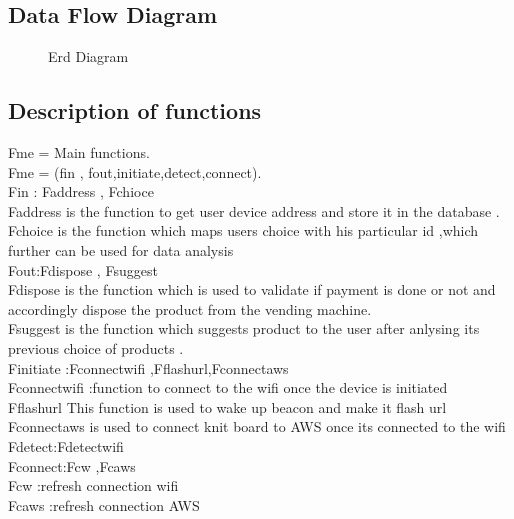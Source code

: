 \documentclass[oneside,a4paper,12pt]{report}
\begin{document}
\subsection{Data Flow Diagram}  
\begin{center}
	\begin{figure}[!htbp]
		\centering
	  \caption{Erd Diagram}
	  \label{fig:act-dig}
	\end{figure}
\end{center}  

\newpage

\subsection{Description of functions}  

Fme = Main functions.\\
Fme = (fin , fout,initiate,detect,connect).\\
Fin : {Faddress , Fchioce}\\
Faddress is the function to get user device address and store it in the database .
Fchoice is the function which maps users choice with his particular id ,which further can be used for data analysis \\
Fout:{Fdispose , Fsuggest}\\
Fdispose is the function which is used to validate if payment is done or not and accordingly dispose the product from the vending machine.\\
Fsuggest is the function which suggests product to the user after anlysing its previous choice of products .\\
Finitiate :{Fconnectwifi ,Fflashurl,Fconnectaws}\\
Fconnectwifi :function to connect to the wifi once the device is initiated\\
Fflashurl This function is used to wake up beacon and make it flash url\\
Fconnectaws is used to connect knit board to AWS once its connected to the wifi\\
Fdetect:{Fdetectwifi}\\
Fconnect:{Fcw ,Fcaws}\\
Fcw :refresh connection wifi\\
Fcaws :refresh connection AWS\\
\end{document}

